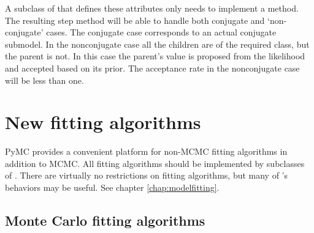 A subclass of  that defines these attributes only needs to implement a  method. The resulting step method will be able to handle both conjugate and `non-conjugate' cases. The conjugate case corresponds to an actual conjugate submodel. In the nonconjugate case all the children are of the required class, but the parent is not. In this case the parent's value is proposed from the likelihood and accepted based on its prior. The acceptance rate in the nonconjugate case will be less than one.

\hypertarget{custom-model}{}
\section*{New fitting algorithms} \label{custom-model}

PyMC provides a convenient platform for non-MCMC fitting algorithms in addition to MCMC. All fitting algorithms should be implemented by subclasses of . There are virtually no restrictions on fitting algorithms, but many of 's behaviors may be useful. See chapter \ref{chap:modelfitting}. 

\hypertarget{custom-MC}{}
\subsection*{Monte Carlo fitting algorithms} \label{custom-MC}

